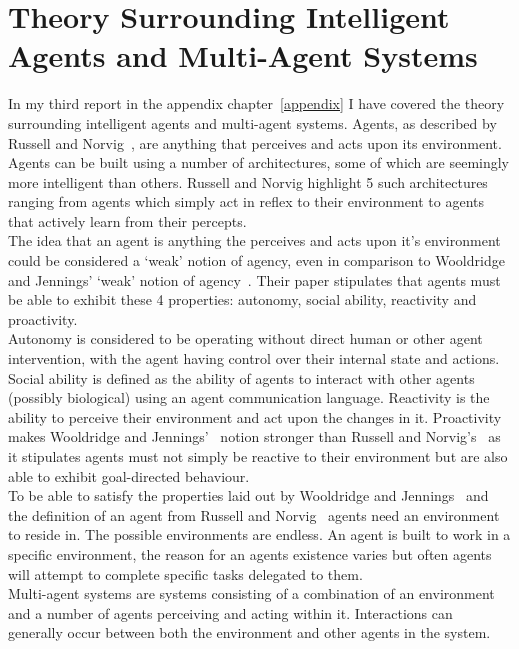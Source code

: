 \documentclass[]{final_report}
\begin{document}
\section{Theory Surrounding Intelligent Agents and Multi-Agent Systems}
In my third report in the appendix chapter~\ref{appendix} I have covered the theory surrounding intelligent agents and multi-agent systems. Agents, as described by Russell and Norvig~\cite{russell2016artificial}, are anything that perceives and acts upon its environment. Agents can be built using a number of architectures, some of which are seemingly more intelligent than others. Russell and Norvig highlight 5 such architectures ranging from agents which simply act in reflex to their environment to agents that actively learn from their percepts.\\
The idea that an agent is anything the perceives and acts upon it's environment could be considered a `weak' notion of agency, even in comparison to Wooldridge and Jennings' `weak' notion of agency~\cite{wooldridge_jennings_1995}. Their paper stipulates that agents must be able to exhibit these 4 properties: autonomy, social ability, reactivity and proactivity.\\
Autonomy is considered to be operating without direct human or other agent intervention, with the agent having control over their internal state and actions. Social ability is defined as the ability of agents to interact with other agents (possibly biological) using an agent communication language. Reactivity is the ability to perceive their environment and act upon the changes in it. Proactivity makes Wooldridge and Jennings'~\cite{wooldridge_jennings_1995} notion stronger than Russell and Norvig's~\cite{russell2016artificial} as it stipulates agents must not simply be reactive to their environment but are also able to exhibit goal-directed behaviour.\\
To be able to satisfy the properties laid out by Wooldridge and Jennings~\cite{wooldridge_jennings_1995} and the definition of an agent from Russell and Norvig~\cite{russell2016artificial} agents need an environment to reside in. The possible environments are endless. An agent is built to work in a specific environment, the reason for an agents existence varies but often agents will attempt to complete specific tasks delegated to them.\\
Multi-agent systems are systems consisting of a combination of an environment and a number of agents perceiving and acting within it. Interactions can generally occur between both the environment and other agents in the system.
\end{document}
